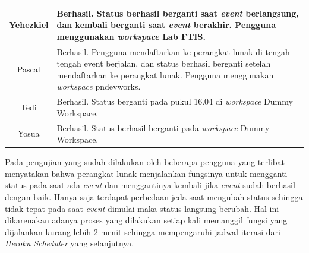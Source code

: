 \begin{center}
\begin{tabular}{ |c|p{9cm}| }
 Yehezkiel & Berhasil. Status berhasil berganti saat \textit{event} berlangsung, dan kembali berganti saat \textit{event} berakhir. Pengguna menggunakan \textit{workspace} Lab FTIS. \\  \hline
 Pascal & Berhasil. Pengguna mendaftarkan ke perangkat lunak di tengah-tengah event berjalan, dan status berhasil berganti setelah mendaftarkan ke perangkat lunak. Pengguna menggunakan \textit{workspace} pndevworks. \\  \hline
 Tedi & Berhasil. Status berganti pada pukul 16.04 di \textit{workspace} Dummy Workspace. \\  \hline
 Yosua & Berhasil. Status berhasil berganti pada \textit{workspace} Dummy Workspace. \\ \hline
 \bottomrule
\end{tabular}
\end{center}

Pada pengujian yang sudah dilakukan oleh beberapa pengguna yang terlibat menyatakan bahwa perangkat lunak menjalankan fungsinya untuk mengganti status pada saat ada \textit{event} dan menggantinya kembali jika \textit{event} sudah berhasil dengan baik. Hanya saja terdapat perbedaan jeda saat mengubah status sehingga tidak tepat pada saat \textit{event} dimulai maka status langsung berubah. Hal ini dikarenakan adanya proses yang dilakukan setiap kali memanggil fungsi yang dijalankan kurang lebih 2 menit sehingga mempengaruhi jadwal iterasi dari \textit{Heroku Scheduler} yang selanjutnya. 